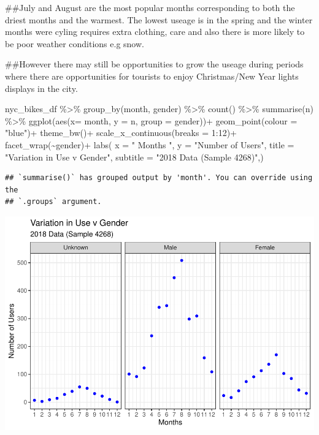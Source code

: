 \documentclass[
]{article}
\newenvironment{Shaded}{\begin{snugshade}}{\end{snugshade}}
\newcommand{\AttributeTok}[1]{\textcolor[rgb]{0.77,0.63,0.00}{#1}}
\newcommand{\DecValTok}[1]{\textcolor[rgb]{0.00,0.00,0.81}{#1}}
\newcommand{\FunctionTok}[1]{\textcolor[rgb]{0.00,0.00,0.00}{#1}}
\newcommand{\NormalTok}[1]{#1}
\newcommand{\SpecialCharTok}[1]{\textcolor[rgb]{0.00,0.00,0.00}{#1}}
\newcommand{\StringTok}[1]{\textcolor[rgb]{0.31,0.60,0.02}{#1}}
\begin{document}
\#\#July and August are the most popular months corresponding to both
the driest months and the warmest. The lowest useage is in the spring
and the winter months were cyling requires extra clothing, care and also
there is more likely to be poor weather conditions e.g snow.

\#\#However there may still be opportunities to grow the useage during
periods where there are opportunities for tourists to enjoy
Christmas/New Year lights displays in the city.

\begin{Shaded}
\begin{Highlighting}[]
\NormalTok{nyc\_bikes\_df }\SpecialCharTok{\%\textgreater{}\%}
  \FunctionTok{group\_by}\NormalTok{(month, gender) }\SpecialCharTok{\%\textgreater{}\%}
  \FunctionTok{count}\NormalTok{() }\SpecialCharTok{\%\textgreater{}\%}
  \FunctionTok{summarise}\NormalTok{(n) }\SpecialCharTok{\%\textgreater{}\%}
\FunctionTok{ggplot}\NormalTok{(}\FunctionTok{aes}\NormalTok{(}\AttributeTok{x=}\NormalTok{ month, }\AttributeTok{y =}\NormalTok{ n, }\AttributeTok{group =}\NormalTok{ gender))}\SpecialCharTok{+}
  \FunctionTok{geom\_point}\NormalTok{(}\AttributeTok{colour =} \StringTok{"blue"}\NormalTok{)}\SpecialCharTok{+}
  \FunctionTok{theme\_bw}\NormalTok{()}\SpecialCharTok{+}
  \FunctionTok{scale\_x\_continuous}\NormalTok{(}\AttributeTok{breaks =} \DecValTok{1}\SpecialCharTok{:}\DecValTok{12}\NormalTok{)}\SpecialCharTok{+}
  \FunctionTok{facet\_wrap}\NormalTok{(}\SpecialCharTok{\textasciitilde{}}\NormalTok{gender)}\SpecialCharTok{+}
  \FunctionTok{labs}\NormalTok{(}
    \AttributeTok{x =} \StringTok{" Months "}\NormalTok{,}
    \AttributeTok{y =} \StringTok{"Number of Users"}\NormalTok{,}
    \AttributeTok{title =} \StringTok{"Variation in Use v Gender"}\NormalTok{,}
    \AttributeTok{subtitle =} \StringTok{"2018 Data (Sample 4268)"}\NormalTok{,)}
\end{Highlighting}
\end{Shaded}

\begin{verbatim}
## `summarise()` has grouped output by 'month'. You can override using the
## `.groups` argument.
\end{verbatim}

\includegraphics{nyc_bikes_presentation_janehogg_files/figure-latex/unnamed-chunk-13-1.pdf}
\end{document}
